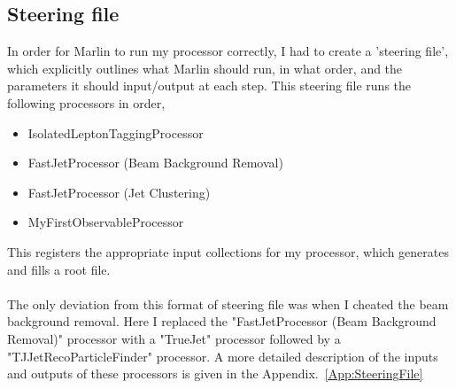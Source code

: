 \subsection{Steering file}
\label{SUBSEC:SteeringFile}

In order for Marlin to run my processor correctly, I had to create a 'steering file’, which explicitly outlines what Marlin should run, in what order, and the parameters it should input/output at each step. This steering file runs the following processors in order,
\begin{itemize}
	\item IsolatedLeptonTaggingProcessor
	\item FastJetProcessor (Beam Background Removal)
	\item FastJetProcessor (Jet Clustering)
	\item MyFirstObservableProcessor
\end{itemize}
This registers the appropriate input collections for my processor, which generates and fills a root file.
\\\\
The only deviation from this format of steering file was when I cheated the beam background removal. Here I replaced the "FastJetProcessor (Beam Background Removal)" processor with a "TrueJet"\cite{TrueJet} processor followed by a "TJJetRecoParticleFinder"\cite{TJJetRecoParticleFinder} processor. A more detailed description of the inputs and outputs of these processors is given in the Appendix.~\ref{App:SteeringFile}
